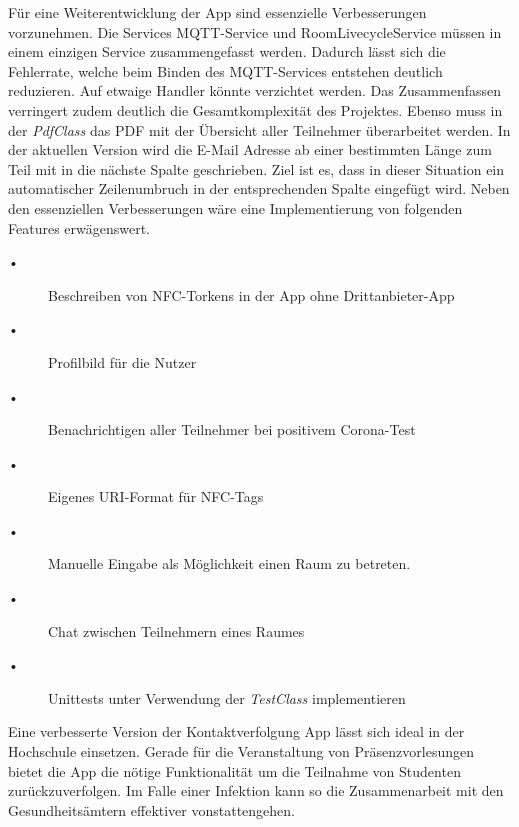 Für eine Weiterentwicklung der App sind essenzielle Verbesserungen vorzunehmen. Die Services MQTT-Service und RoomLivecycleService müssen in einem einzigen Service zusammengefasst werden. 
Dadurch lässt sich die Fehlerrate, welche beim Binden des MQTT-Services entstehen deutlich reduzieren. Auf etwaige Handler könnte verzichtet werden. 
Das Zusammenfassen verringert zudem deutlich die Gesamtkomplexität des Projektes.
 Ebenso muss in der \textit{PdfClass} das PDF mit der Übersicht aller Teilnehmer überarbeitet werden. 
 In der aktuellen Version wird die E-Mail Adresse ab einer bestimmten Länge zum Teil mit in die nächste Spalte geschrieben.
 Ziel ist es, dass in dieser Situation ein automatischer Zeilenumbruch in der entsprechenden Spalte eingefügt wird.
Neben den essenziellen Verbesserungen  wäre eine Implementierung von folgenden Features erwägenswert.
\begin{description}
\item[•]Beschreiben von NFC-Torkens in der App ohne Drittanbieter-App 
\item[•]Profilbild für die Nutzer
\item[•]Benachrichtigen aller Teilnehmer bei positivem Corona-Test
\item[•]Eigenes URI-Format für NFC-Tags
\item[•]Manuelle Eingabe als Möglichkeit einen Raum zu betreten.
\item[•]Chat zwischen Teilnehmern eines Raumes
\item[•]Unittests unter Verwendung der \textit{TestClass} implementieren
\end{description}


Eine verbesserte Version der Kontaktverfolgung App lässt sich ideal in der Hochschule einsetzen. 
Gerade für die Veranstaltung von Präsenzvorlesungen bietet die App die nötige Funktionalität um die Teilnahme von Studenten zurückzuverfolgen.
Im Falle einer Infektion kann so die Zusammenarbeit mit den Gesundheitsämtern effektiver vonstattengehen.